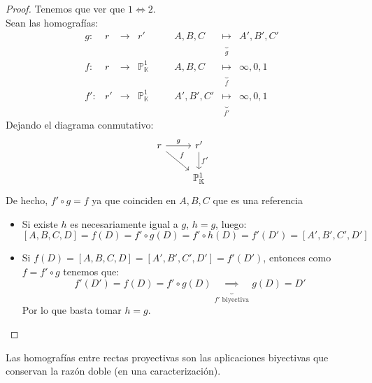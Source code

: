 \begin{proof}
    Tenemos que ver que $1 \iff 2$.\\
    Sean las homografías:
        \[
        \begin{array}{cccccccc}
            g: & r & \to & r' & \quad & A,B,C & \underbrace{\mapsto}_{g} & A',B',C' \\
            f: & r & \to & \mathbb{P}^1_{\mathbb{K}} & \quad & A,B,C & \underbrace{\mapsto}_{f} & \infty ,0,1 \\
            f': & r' & \to & \mathbb{P}^1_{\mathbb{K}} & \quad & A',B',C' & \underbrace{\mapsto}_{f'} & \infty,0,1
        \end{array}
        \]
        Dejando el diagrama conmutativo:
        \[
        \begin{tikzcd}
            r \arrow{r}{g} \arrow{rd}{f} & r' \arrow{d}{f'} \\
            & \mathbb{P}^1_{\mathbb{K}}
        \end{tikzcd}
        \]
        De hecho, $f' \circ g = f$ ya que coinciden en $A,B,C$ que es una referencia
    \begin{itemize}
        \item[$\implies$] Si existe $h$ es necesariamente igual a $g$, $h = g$, luego:
        \[
        \left[ A, B, C, D \right] =
        f(D) =
        f' \circ g(D) =
        f' \circ h(D) =
        f'(D') =
        \left[ A', B', C', D'\right]
        \]
        \item[$\impliedby$] Si $f(D) = \left[ A, B, C, D \right] = \left[ A', B', C', D' \right] = f'(D')$, entonces como $f = f' \circ g$ tenemos que:
        \[
        f'(D') =
        f(D) =
        f' \circ g(D) \underbrace{\implies}_{f' \text{ biyectiva}} 
        g(D) = 
        D'
        \]
        Por lo que basta tomar $h = g$.
    \end{itemize}
\end{proof}

\begin{corolario}
    Las homografías entre rectas proyectivas son las aplicaciones biyectivas que conservan la razón doble (en una caracterización).
\end{corolario}

